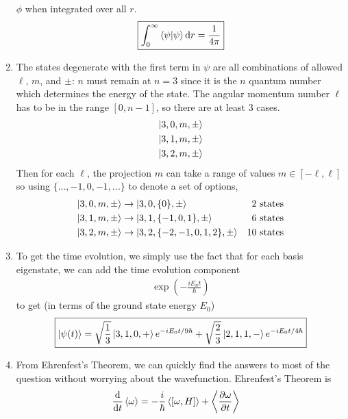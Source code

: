 \begin{enumerate}
		$\phi $ when integrated over all $r$.
		\begin{align}
			\boxed{
			\int_0^\infty  \braket{\psi }{\psi } \dd r = \frac{1}{4{\pi}}
			}
		\end{align}
	\item
		The states degenerate with the first term in $\psi $ are all combinations
		of allowed $\ell $, $m$, and $\pm$: $n$ must remain at $n=3$ since it is the
		$n$ quantum number which determines the energy of the state. The
		angular momentum number $\ell $ has to be in the range $[0, n-1]$, so there
		are at least 3 cases.
		\begin{align*}
			\ket{3,0,m,\pm} \\
			\ket{3,1,m,\pm} \\
			\ket{3,2,m,\pm}
		\end{align*}
		Then for each $\ell $, the projection $m$ can take a range of values
		$m \in [-\ell ,\ell ]$ so using $\{...,-1,0,-1,...\}$ to denote a set of options,
		\begin{align*}
			\ket{3,0,m,\pm} &\rightarrow \ket{3,0,\{0\},\pm}
				& \text{2 states} \\
			\ket{3,1,m,\pm} &\rightarrow \ket{3,1,\{-1,0,1\},\pm}
				& \text{6 states} \\
			\ket{3,2,m,\pm} &\rightarrow \ket{3,2,\{-2,-1,0,1,2\},\pm}
				& \text{10 states}
		\end{align*}
		\begin{center}
		\end{center}
	\item
		To get the time evolution, we simply use the fact that for each basis
		eigenstate, we can add the time evolution component
		\begin{align*}
			\exp (-\frac{iE_nt}{{\hbar}})
		\end{align*}
		to get (in terms of the ground state energy $E_0$)
		\begin{align}
			\boxed{
			\ket{\psi (t)} = \sqrt{\frac 13}\ket{3,1,0,+} e^{-iE_0t/9{\hbar}} +
				\sqrt{\frac 23} \ket{2,1,1,-} e^{-iE_0t/4{\hbar}}
			}
		\end{align}
	\item
		From Ehrenfest's Theorem, we can quickly find the answers to most of
		the question without worrying about the wavefunction. Ehrenfest's
		Theorem is
		\begin{align*}
			\frac{\dd}{\dd t}\expval{\omega} &= -\frac i{\hbar} \expval{[{\omega},H]} +
				\expval{\frac{\partial {\omega}}{\partial t}}

\end{align*}
\end{enumerate}
